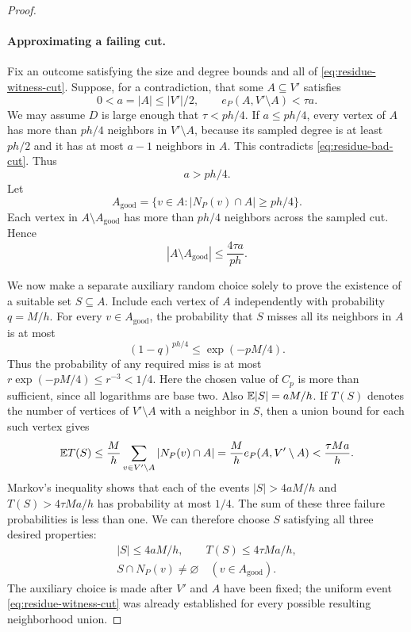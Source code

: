 \begin{proof}
\paragraph{Approximating a failing cut.}
Fix an outcome satisfying the size and degree bounds and all of
\eqref{eq:residue-witness-cut}.  Suppose, for a contradiction, that
some $A\subseteq V'$ satisfies
\begin{equation}\label{eq:residue-bad-cut}
  0<a=|A|\le |V'|/2,
  \qquad e_P(A,V'\setminus A)<\tau a.
\end{equation}
We may assume $D$ is large enough that $\tau<ph/4$.  If $a\le ph/4$,
every vertex of $A$ has more than $ph/4$ neighbors in $V'\setminus A$,
because its sampled degree is at least $ph/2$ and it has at most
$a-1$ neighbors in $A$.  This contradicts
\eqref{eq:residue-bad-cut}.  Thus
\begin{equation}\label{eq:residue-bad-cut-size}
  a>ph/4.
\end{equation}
Let
\[
  A_{\mathrm{good}}=
    \{v\in A:|N_P(v)\cap A|\ge ph/4\}.
\]
Each vertex in $A\setminus A_{\mathrm{good}}$ has more than $ph/4$
neighbors across the sampled cut.  Hence
\begin{equation}\label{eq:residue-exceptional-vertices}
  |A\setminus A_{\mathrm{good}}|
       \le\frac{4\tau a}{ph}.
\end{equation}

We now make a separate auxiliary random choice solely to prove the
existence of a suitable set $S\subseteq A$.  Include each vertex of
$A$ independently with probability $q=M/h$.  For every
$v\in A_{\mathrm{good}}$, the probability that $S$ misses all its
neighbors in $A$ is at most
\[
  (1-q)^{ph/4}\le\exp(-pM/4).
\]
Thus the probability of any required miss is at most
$r\exp(-pM/4)\le r^{-3}<1/4$.  Here the chosen value of $C_p$
is more than sufficient, since all logarithms are base two.
Also $\mathbb E|S|=aM/h$.  If $T(S)$ denotes the number of vertices of
$V'\setminus A$ with a neighbor in $S$, then a union bound for each
such vertex gives
\[
  \mathbb E T(S)
  \le\frac Mh\sum_{v\in V'\setminus A}|N_P(v)\cap A|
  =\frac Mh e_P(A,V'\setminus A)
  <\frac{\tau Ma}{h}.
\]
Markov's inequality shows that each of the events
$|S|>4aM/h$ and $T(S)>4\tau Ma/h$ has probability at most $1/4$.
The sum of these three failure probabilities is less than one.
We can therefore choose $S$ satisfying all three desired properties:
\begin{equation}\label{eq:residue-hitting-set}
\begin{gathered}
  |S|\le4aM/h,\qquad T(S)\le4\tau Ma/h,\\
  S\cap N_P(v)\ne\varnothing
      \quad(v\in A_{\mathrm{good}}).
\end{gathered}
\end{equation}
The auxiliary choice is made after $V'$ and $A$ have been fixed; the
uniform event \eqref{eq:residue-witness-cut} was already established
for every possible resulting neighborhood union.


\end{proof}

